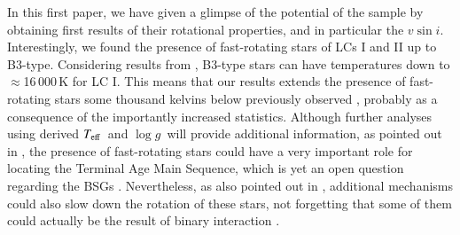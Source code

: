 \documentclass{aa}
\newcommand{\vsini}{\mbox{$v\sin i$}}
\newcommand{\Teff}{\mbox{$T_{\rm eff}$}}
\newcommand{\logg}{\mbox{$\log g$}}
\begin{document}
In this first paper, we have given a glimpse of the potential of the sample by obtaining first results of their rotational properties, and in particular the \vsini. Interestingly, we found the presence of fast-rotating stars of LCs I and II up to B3-type. Considering results from \citet{2006A&A...446..279C,2022A&A...668A..92W}, B3-type stars can have temperatures down to $\approx$16\,000\,K for LC I. This means that our results extends the presence of fast-rotating stars some thousand kelvins below previously observed \citep[e.g.][]{2010MNRAS.404.1306F,2010A&A...512L...7V}, probably as a consequence of the importantly increased statistics. Although further analyses using derived \Teff\ and \logg\ will provide additional information, as pointed out in \citet{2010A&A...512L...7V}, the presence of fast-rotating stars could have a very important role for locating the Terminal Age Main Sequence, which is yet an open question regarding the BSGs \citep[see also][]{2014A&A...570L..13C}. Nevertheless, as also pointed out in \citet{2010A&A...512L...7V}, additional mechanisms \citep[e.g. enhanced mass losses,][]{2010A&A...512L...7V} could also slow down the rotation of these stars, not forgetting that some of them could actually be the result of binary interaction \citep{2013ApJ...764..166D}. 



\end{document}
